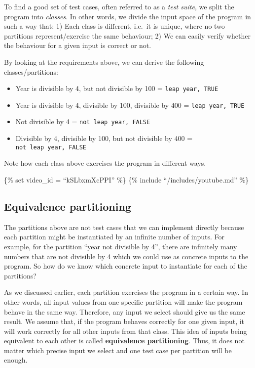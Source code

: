 To find a good set of test cases, often referred to as a \emph{test
suite}, we split the program into \emph{classes}. In other words, we
divide the input space of the program in such a way that: 1) Each class
is different, i.e.~it is unique, where no two partitions
represent/exercise the same behaviour; 2) We can easily verify whether
the behaviour for a given input is correct or not.

By looking at the requirements above, we can derive the following
classes/partitions:

\begin{itemize}
\tightlist
\item
  Year is divisible by 4, but not divisible by 100 =
  \texttt{leap\ year,\ TRUE}
\item
  Year is divisible by 4, divisible by 100, divisible by 400 =
  \texttt{leap\ year,\ TRUE}
\item
  Not divisible by 4 = \texttt{not\ leap\ year,\ FALSE}
\item
  Divisible by 4, divisible by 100, but not divisible by 400 =
  \texttt{not\ leap\ year,\ FALSE}
\end{itemize}

Note how each class above exercises the program in different ways.

\{\% set video\_id = ``kSLbxmXcPPI'' \%\} \{\% include
``/includes/youtube.md'' \%\}

\hypertarget{equivalence-partitioning}{%
\subsection{Equivalence partitioning}\label{equivalence-partitioning}}

The partitions above are not test cases that we can implement directly
because each partition might be instantiated by an infinite number of
inputs. For example, for the partition ``year not divisible by 4'',
there are infinitely many numbers that are not divisible by 4 which we
could use as concrete inputs to the program. So how do we know which
concrete input to instantiate for each of the partitions?

As we discussed earlier, each partition exercises the program in a
certain way. In other words, all input values from one specific
partition will make the program behave in the same way. Therefore, any
input we select should give us the same result. We assume that, if the
program behaves correctly for one given input, it will work correctly
for all other inputs from that class. This idea of inputs being
equivalent to each other is called \textbf{equivalence partitioning}.
Thus, it does not matter which precise input we select and one test case
per partition will be enough.

